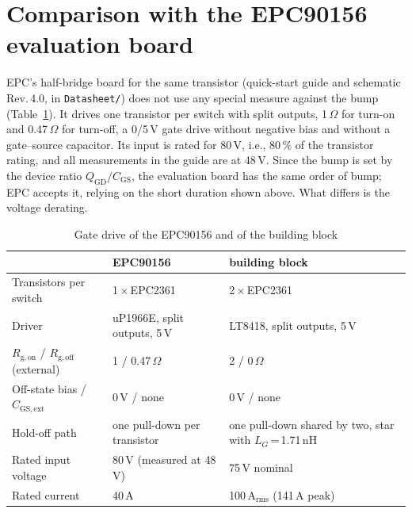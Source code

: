 \documentclass[10pt,a4paper]{article}
\begin{document}
\section{Comparison with the EPC90156 evaluation board}
EPC's half-bridge board for the same transistor (quick-start guide and schematic Rev.\,4.0, in \texttt{Datasheet/}) does not use any special measure against the bump (Table~\ref{tab:epc}). It drives one transistor per switch with split outputs, 1\,$\Omega$ for turn-on and 0.47\,$\Omega$ for turn-off, a 0/5\,V gate drive without negative bias and without a gate--source capacitor. Its input is rated for 80\,V, i.e., 80\,\% of the transistor rating, and all measurements in the guide are at 48\,V. Since the bump is set by the device ratio $Q_\mathrm{GD}/C_\mathrm{GS}$, the evaluation board has the same order of bump; EPC accepts it, relying on the short duration shown above. What differs is the voltage derating.

\begin{table}[h]
\centering\small
\caption{Gate drive of the EPC90156 and of the building block}
\label{tab:epc}
\begin{tabular}{@{}lll@{}}
\toprule
 & EPC90156 & building block \\
\midrule
Transistors per switch & 1\,$\times$\,EPC2361 & 2\,$\times$\,EPC2361 \\
Driver & uP1966E, split outputs, 5\,V & LT8418, split outputs, 5\,V \\
$R_\mathrm{g,on}$ / $R_\mathrm{g,off}$ (external) & 1 / 0.47\,$\Omega$ & 2 / 0\,$\Omega$ \\
Off-state bias / $C_\mathrm{GS,ext}$ & 0\,V / none & 0\,V / none \\
Hold-off path & one pull-down per transistor & one pull-down shared by two, star with $L_G$\,=\,1.71\,nH \\
Rated input voltage & 80\,V (measured at 48\,V) & 75\,V nominal \\
Rated current & 40\,A & 100\,A$_\mathrm{rms}$ (141\,A peak) \\
\bottomrule
\end{tabular}
\end{table}
\end{document}

